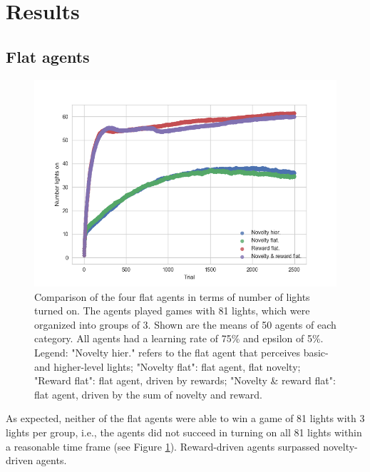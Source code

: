 \documentclass{article}
\begin{document}
\section{Results}

\subsection{Flat agents}

\begin{figure}[h]
  \centering
  \includegraphics[width=\linewidth]{NIPSfigures/NLights.png}
  \caption{Comparison of the four flat agents in terms of number of lights turned on. The agents played games with 81 lights, which were organized into groups of 3. Shown are the means of 50 agents of each category. All agents had a learning rate of 75\% and epsilon of 5\%. Legend: "Novelty hier." refers to the flat agent that perceives basic- and higher-level lights; "Novelty flat": flat agent, flat novelty; "Reward flat": flat agent, driven by rewards; "Novelty \& reward flat": flat agent, driven by the sum of novelty and reward.}
  \label{ResultsFlatFigure}
\end{figure}

As expected, neither of the flat agents were able to win a game of 81 lights with 3 lights per group, i.e., the agents did not succeed in turning on all 81 lights within a reasonable time frame (see Figure \ref{ResultsFlatFigure}). Reward-driven agents surpassed novelty-driven agents. 
\end{document}
